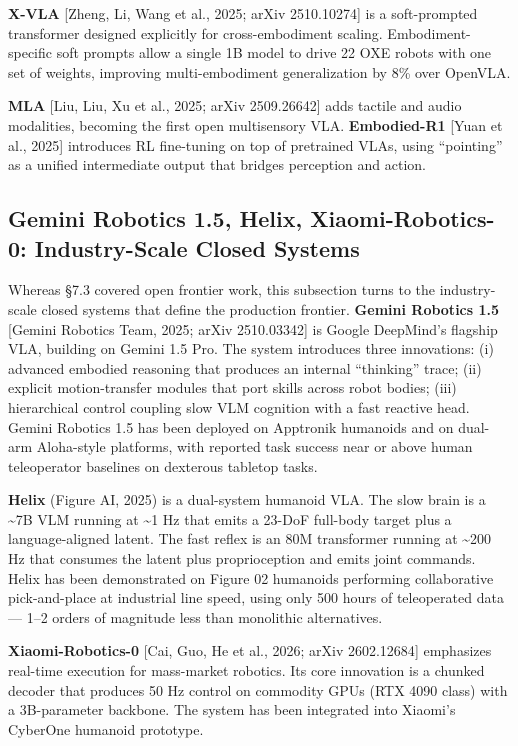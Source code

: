 \textbf{X-VLA} {[}Zheng, Li, Wang et al., 2025; arXiv 2510.10274{]} is a soft-prompted transformer designed explicitly for cross-embodiment scaling. Embodiment-specific soft prompts allow a single 1B model to drive 22 OXE robots with one set of weights, improving multi-embodiment generalization by 8\% over OpenVLA.

\textbf{MLA} {[}Liu, Liu, Xu et al., 2025; arXiv 2509.26642{]} adds tactile and audio modalities, becoming the first open multisensory VLA. \textbf{Embodied-R1} {[}Yuan et al., 2025{]} introduces RL fine-tuning on top of pretrained VLAs, using ``pointing'' as a unified intermediate output that bridges perception and action.

\subsection{Gemini Robotics 1.5, Helix, Xiaomi-Robotics-0: Industry-Scale Closed Systems}\label{gemini-robotics-1.5-helix-xiaomi-robotics-0-industry-scale-closed-systems}

Whereas §7.3 covered open frontier work, this subsection turns to the industry-scale closed systems that define the production frontier. \textbf{Gemini Robotics 1.5} {[}Gemini Robotics Team, 2025; arXiv 2510.03342{]} is Google DeepMind's flagship VLA, building on Gemini 1.5 Pro. The system introduces three innovations: (i) advanced embodied reasoning that produces an internal ``thinking'' trace; (ii) explicit motion-transfer modules that port skills across robot bodies; (iii) hierarchical control coupling slow VLM cognition with a fast reactive head. Gemini Robotics 1.5 has been deployed on Apptronik humanoids and on dual-arm Aloha-style platforms, with reported task success near or above human teleoperator baselines on dexterous tabletop tasks.

\textbf{Helix} (Figure AI, 2025) is a dual-system humanoid VLA. The slow brain is a \textasciitilde7B VLM running at \textasciitilde1 Hz that emits a 23-DoF full-body target plus a language-aligned latent. The fast reflex is an 80M transformer running at \textasciitilde200 Hz that consumes the latent plus proprioception and emits joint commands. Helix has been demonstrated on Figure 02 humanoids performing collaborative pick-and-place at industrial line speed, using only 500 hours of teleoperated data --- 1--2 orders of magnitude less than monolithic alternatives.

\textbf{Xiaomi-Robotics-0} {[}Cai, Guo, He et al., 2026; arXiv 2602.12684{]} emphasizes real-time execution for mass-market robotics. Its core innovation is a chunked decoder that produces 50 Hz control on commodity GPUs (RTX 4090 class) with a 3B-parameter backbone. The system has been integrated into Xiaomi's CyberOne humanoid prototype.

